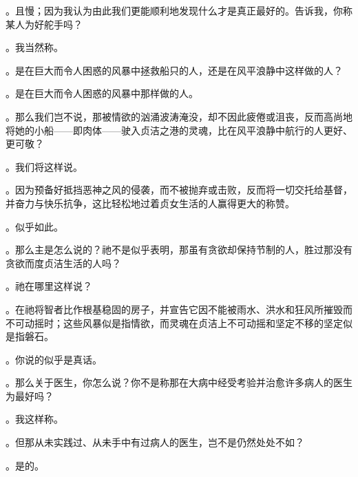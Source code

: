 。且慢；因为我认为由此我们更能顺利地发现什么才是真正最好的。告诉我，你称某人为好舵手吗？\par

。我当然称。\par

。是在巨大而令人困惑的风暴中拯救船只的人，还是在风平浪静中这样做的人？\par

。是在巨大而令人困惑的风暴中那样做的人。\par

。那么我们岂不说，那被情欲的汹涌波涛淹没，却不因此疲倦或沮丧，反而高尚地将她的小船——即肉体——驶入贞洁之港的灵魂，比在风平浪静中航行的人更好、更可敬？\par

。我们将这样说。\par

。因为预备好抵挡恶神之风的侵袭，而不被抛弃或击败，反而将一切交托给基督，并奋力与快乐抗争，这比轻松地过着贞女生活的人赢得更大的称赞。\par

。似乎如此。\par

。那么主是怎么说的？祂不是似乎表明，那虽有贪欲却保持节制的人，胜过那没有贪欲而度贞洁生活的人吗？\par

。祂在哪里这样说？\par

。在祂将智者比作根基稳固的房子，并宣告它因不能被雨水、洪水和狂风所摧毁而不可动摇时；这些风暴似是指情欲，而灵魂在贞洁上不可动摇和坚定不移的坚定似是指磐石。\par

。你说的似乎是真话。\par

。那么关于医生，你怎么说？你不是称那在大病中经受考验并治愈许多病人的医生为最好吗？\par

。我这样称。\par

。但那从未实践过、从未手中有过病人的医生，岂不是仍然处处不如？\par

。是的。\par

